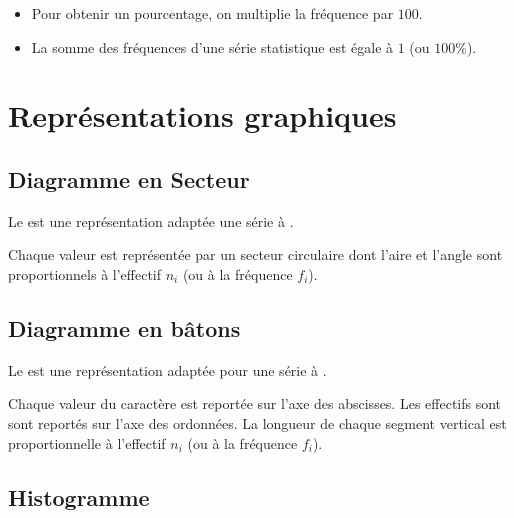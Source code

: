 \documentclass[12pt,a4paper]{article}
\begin{document}
	\begin{myrems}
		\begin{itemize}
			\item Pour obtenir un pourcentage, on multiplie la fréquence par $100$. 
			\item La somme des fréquences d'une série statistique est égale à $1$ (ou $100\%$).
		\end{itemize}
		
	\end{myrems}

\section{Représentations graphiques}



\subsection{Diagramme en Secteur}

\begin{mybox}

		

	 Le  est une représentation adaptée une série à .
	
	 Chaque valeur est représentée par un secteur circulaire dont l'aire et l'angle sont proportionnels à l'effectif $n_i$ (ou à la fréquence $f_i$).
	
\end{mybox}	




\subsection{Diagramme en bâtons}

\begin{mybox}
	Le  est une représentation adaptée pour une série à .
	
	Chaque valeur du caractère est reportée sur l'axe des abscisses. Les effectifs sont sont reportés sur l'axe des ordonnées.
	La longueur de chaque segment vertical est proportionnelle à l'effectif $n_i$ (ou à la fréquence $f_i$).
\end{mybox}


\subsection{Histogramme}
\end{document}
